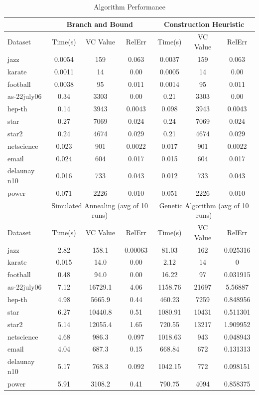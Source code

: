 \documentclass[acmlarge]{acmart}
\begin{document}
\begin{table}[H]
	\caption{Algorithm Performance}
	\label{tab:freq}
	\begin{tabular}{|l|c|c|c|c|c|c|}
		\toprule
		&\multicolumn{3}{c|}{Branch and Bound}&\multicolumn{3}{c|}{Construction Heuristic}\\
		\midrule
		Dataset&Time(s)&VC Value&RelErr&Time(s)&VC Value&RelErr\\
		\midrule
		jazz&0.0054&159&0.063&0.0037&159&0.063\\
		karate&0.0011&14&0.00&0.0005&14&0.00\\
		football&0.0038&95&0.011&0.0014&95&0.011\\
		as-22july06&0.34&3303&0.00&0.21&3303&0.00\\
		hep-th&0.14&3943&0.0043&0.098&3943&0.0043\\
		star&0.27&7069&0.024&0.24&7069&0.024\\
		star2&0.24&4674&0.029&0.21&4674&0.029\\
		netscience&0.023&901&0.0022&0.017&901&0.0022\\
		email&0.024&604&0.017&0.015&604&0.017\\
		delaunay n10&0.016&733&0.043&0.012&733&0.043\\
		power&0.071&2226&0.010&0.051&2226&0.010\\
        \midrule
        &\multicolumn{3}{c|}{Simulated Annealing (avg of 10 runs)}&\multicolumn{3}{c|}{Genetic Algorithm (avg of 10 runs)}\\
        \midrule
        Dataset&Time(s)&VC Value&RelErr&Time(s)&VC Value&RelErr\\
		\midrule
        jazz&2.82&158.1&0.00063&81.03&162&0.025316\\
		karate&0.015&14.0&0.00&2.12&14&0\\
		football&0.48&94.0&0.00&16.22&97&0.031915\\
        as-22july06&7.12&16729.1&4.06&1158.76&21697&5.56887\\
		hep-th&4.98&5665.9&0.44&460.23&7259&0.848956\\
		star&6.27&10440.8&0.51&1080.91&10431&0.511301\\
		star2&5.14&12055.4&1.65&720.55&13217&1.909952\\
		netscience&4.68&986.3&0.097&1018.63&943&0.048943\\
		email&4.04&687.3&0.15&668.84&672&0.131313\\
		delaunay n10&5.17&768.3&0.092&1042.15&772&0.098151\\
		power&5.91&3108.2&0.41&790.75&4094&0.858375\\
		\bottomrule
	\end{tabular}
\label{table:alg_perf}
\end{table}
\end{document}
